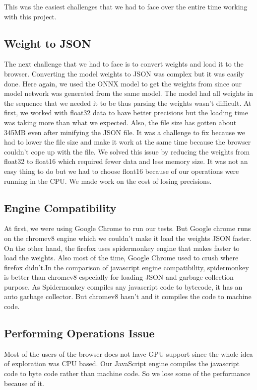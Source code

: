 \documentclass[a4paper,12pt]{article}
\begin{document}
This was the easiest challenges that we had to face over the entire time working with this project.

\subsection{Weight to JSON}
The next challenge that we had to face is to convert weights and load it to the browser. Converting the model weights to JSON was complex but it was easily done. Here again, we used the ONNX model to get the weights from since our model network was generated from the same model. The model had all weights in the sequence that we needed it to be thus parsing the weights wasn't difficult. At first, we worked with float32 data to have better precisions but the loading time was taking more than what we expected. Also, the file size has gotten about 345MB even after minifying the JSON file. It was a challenge to fix because we had to lower the file size and make it work at the same time because the browser couldn't cope up with the file. We solved this issue by reducing the weights from float32 to float16 which required fewer data and less memory size. It was not an easy thing to do but we had to choose float16 because of our operations were running in the CPU. We made work on the cost of losing precisions.

\subsection{Engine Compatibility}
At first, we were using Google Chrome to run our tests. But Google chrome runs on the chromev8 engine which we couldn't make it load the weights JSON faster. On the other hand, the firefox uses spidermonkey engine that makes faster to load the weights. Also most of the time, Google Chrome used to crush where firefox didn't.In the comparison of javascript engine compatibility, spidermonkey is better than chromev8 especially for loading JSON and garbage collection purpose.
As Spidermonkey compiles any javascript code to bytecode, it has an auto garbage collector. But chromev8 hasn't and it compiles the code to machine code.


\subsection{Performing Operations Issue }
Most of the users of the browser does not have GPU support since the whole idea of exploration was CPU based. Our JavaScript engine compiles the javascript code to byte code rather than machine code. So we lose some of the performance because of it. 
\end{document}
